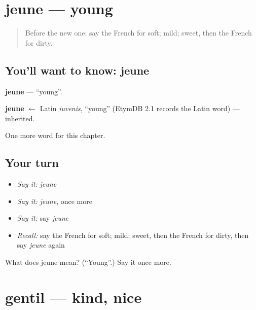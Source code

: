 \section[jeune]{jeune — young}

\label{lesson:FR-C92-jeune}



\begin{quote}
Before the new one: say the French for soft; mild; sweet, then the French for dirty.
\end{quote}

\subsection*{You'll want to know: jeune}
\textbf{jeune} — \textquotedblleft{}young\textquotedblright{}.

\begin{cousinweb}
\textbf{jeune} $\leftarrow$ Latin \emph{iuvenis}, \textquotedblleft{}young\textquotedblright{} (EtymDB 2.1 records the Latin word) — inherited.
\end{cousinweb}

\begin{grammarlens}[title={What you've built}]
One more word for this chapter.
\end{grammarlens}

\subsection*{Your turn}
\begin{itemize}
\raggedright
  \item \emph{Say it:} \emph{jeune}
  \item \emph{Say it:} \emph{jeune}, once more
  \item \emph{Say it:} say \emph{jeune}
  \item \emph{Recall:} say the French for soft; mild; sweet, then the French for dirty, then say \emph{jeune} again
\end{itemize}

\begin{tcolorbox}[breakable,colback=teal!4,colframe=teal!35!black,title={Before you move on}]
What does jeune mean? (\textquotedblleft{}Young\textquotedblright{}.) Say it once more.
\end{tcolorbox}
\section[gentil]{gentil — kind, nice}

